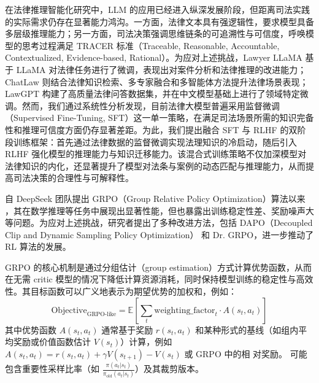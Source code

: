 \documentclass{pkuthesis}
\begin{document}
在法律推理智能化研究中，LLM 的应用已经进入纵深发展阶段，但距离司法实践的实际需求仍存在显著能力鸿沟。一方面，法律文本具有强逻辑性，要求模型具备多层级推理能力；另一方面，司法决策强调思维链条的可追溯性与可信度，呼唤模型的思考过程满足 TRACER 标准（Traceable, Reasonable, Accountable, Contextualized, Evidence-based, Rational）。为应对上述挑战，Lawyer LLaMA\cite{huang2023lawyer} 基于 LLaMA 对法律任务进行了微调，表现出对案件分析和法律推理的改进能力；ChatLaw\cite{cui2023chatlaw} 则结合法律知识检索、多专家融合和多智能体方法提升法律场景表现；LawGPT\cite{zhou2024lawgpt} 构建了高质量法律问答数据集，并在中文模型基础上进行了领域特定微调。然而，我们通过系统性分析发现，目前法律大模型普遍采用监督微调（Supervised Fine-Tuning, SFT）这一单一策略，在满足司法场景所需的知识完备性和推理可信度方面仍存显著差距。为此，我们提出融合 SFT 与 RLHF 的双阶段训练框架：首先通过法律数据的监督微调实现法理知识的冷启动，随后引入 RLHF 强化模型的推理能力与知识迁移能力。该混合式训练策略不仅加深模型对法律知识的内化，还显著提升了模型对法条与案例的动态匹配与推理能力，从而提高司法决策的合理性与可解释性。

自 DeepSeek 团队提出 GRPO（Group Relative Policy Optimization）算法以来 \cite{shao2024deepseekmath}，其在数学推理等任务中展现出显著性能，但也暴露出训练稳定性差、奖励噪声大等问题。为应对上述挑战，研究者提出了多种改进方法，包括 DAPO（Decoupled Clip and Dynamic Sampling Policy Optimization）\cite{yu2025dapo} 和 Dr. GRPO\cite{liu2025understanding}，进一步推动了 RL 算法的发展。

GRPO 的核心机制是通过分组估计（group estimation）方式计算优势函数，从而在无需 critic 模型的情况下降低计算资源消耗，同时保持模型训练的稳定性与高效性。其目标函数可以广义地表示为期望优势的加权和，例如：
\begin{equation}
\text{Objective}_{\text{GRPO-like}} = \mathbb{E} \left[\sum_{t} \text{weighting\_factor}_t \cdot A(s_t, a_t)\right]
\end{equation}
其中优势函数 $A(s_t,a_t)$ 通常基于奖励 
$r(s_t,a_t)$ 和某种形式的基线（如组内平均奖励或价值函数估计 
$V(s_t)$）计算，例如 
$A(s_t,a_t)=r(s_t,a_t)+\gamma V(s_{t+1})-V(s_t)$ 或 GRPO 中的相
对奖励。 可能包含重要性采样比率（如 
$\frac{\pi(a_t|s_t)}{\pi_{\text{old}}(a_t|s_t)}$）及其裁剪版本。
\end{document}
